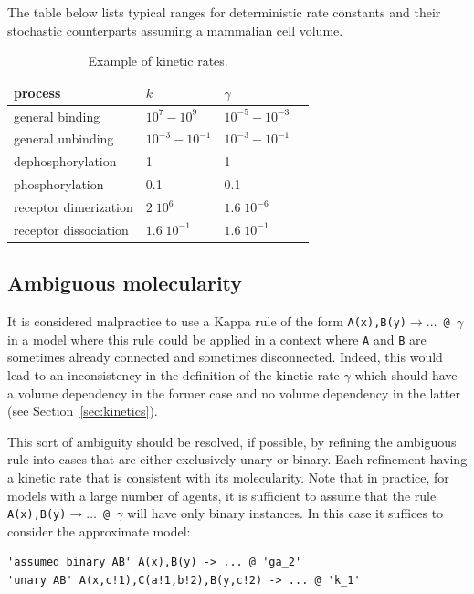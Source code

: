 \documentclass[11pt]{book}
\def\ttt#1{\texttt{#1}}
\def\rar{\rightarrow}
\def\ga{\gamma}
\begin{document}
The table below lists typical ranges for deterministic rate constants and 
their stochastic counterparts assuming a mammalian cell volume.

\begin{table}[htbp]
\centering
\caption{Example of kinetic rates.}
\begin{tabular}{@{} lllr @{} }
\toprule
process & $k$ & $\gamma$ %
\\
\midrule
general binding & $10^{7}-10^{9}$ & $10^{-5}-10^{-3}$ %
\\
general unbinding &  $10^{-3} - 10^{-1}$ & $10^{-3}-10^{-1}$ %
\\
dephosphorylation & 1 & 1 %
\\
phosphorylation & 0.1 & 0.1 %
\\
receptor dimerization & $2\; 10^{6}$ & $1.6 \;10^{-6}$ %
\\
receptor dissociation & $1.6\; 10^{-1}$ & $1.6\; 10^{-1}$ %
\\
\bottomrule
\end{tabular}
\end{table}

\subsection{Ambiguous molecularity}\label{sec:ambiguous}

It is considered malpractice to use a Kappa rule of the form \ttt{A(x),B(y)$\rar \dots$ @ $\ga$} in a model where this rule could be applied in a context where \ttt{A} and \ttt{B} are sometimes already connected and sometimes disconnected. Indeed, this would lead to an inconsistency in the definition of the kinetic rate $\ga$ which should have a volume dependency in the former case and no volume dependency in the latter (see Section~\ref{sec:kinetics}). 

This sort of ambiguity should be resolved, if possible, by refining the ambiguous rule into cases that are either exclusively unary or binary. Each refinement having a kinetic rate that is consistent with its molecularity. Note that in practice, for models with a large number of agents, it is sufficient to assume that the rule \ttt{A(x),B(y)$\rar \dots$ @ $\ga$} will have only binary instances. In this case it suffices to consider the approximate model:
\begin{lstlisting}[language=kappa]
'assumed binary AB' A(x),B(y) -> ... @ 'ga_2'
'unary AB' A(x,c!1),C(a!1,b!2),B(y,c!2) -> ... @ 'k_1'
\end{lstlisting}
\end{document}
